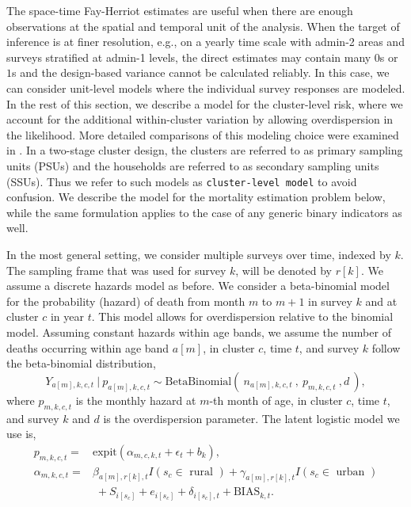 The space-time Fay-Herriot estimates are useful when there are enough observations at the spatial and temporal unit of the analysis. When the target of inference is at finer resolution, e.g., on a yearly time scale with admin-2 areas and surveys stratified at admin-1 levels, the direct estimates may contain many \(0\)s or \(1\)s and the design-based variance cannot be calculated reliably. In this case, we can consider unit-level models where the individual survey responses are modeled. In the rest of this section, we describe a model for the cluster-level risk, where we account for the additional within-cluster variation by allowing overdispersion in the likelihood. More detailed comparisons of this modeling choice were examined in \citep{dong_wakefield_20}. In a two-stage cluster design, the clusters are referred to as primary sampling units (PSUs) and the households are referred to as secondary sampling units (SSUs). Thus we refer to such models as \texttt{cluster-level\ model} to avoid confusion. We describe the model for the mortality estimation problem below, while the same formulation applies to the case of any generic binary indicators as well.

In the most general setting, we consider multiple surveys over time, indexed by \(k\). The sampling frame that was used for survey \(k\), will be denoted by \(r[k]\). We assume a discrete hazards model as before. We consider a beta-binomial model for the probability (hazard) of death from month \(m\) to \(m+1\) in survey \(k\) and at cluster \(c\) in year \(t\). This model allows for overdispersion relative to the binomial model. Assuming constant hazards within age bands, we assume the number of deaths occurring within age band \(a[m]\), in cluster \(c\), time \(t\), and survey \(k\) follow the beta-binomial distribution,
\begin{equation}\label{eq:BB1-age}
Y_{a[m],k,c,t} ~|~  p_{a[m],k,c,t} \sim \mbox{BetaBinomial}\left(~ n_{a[m],k,c,t}~,~ p_{m,k,c,t}~,d~
\right),
\end{equation}
where \(p_{m,k,c,t}\) is the monthly hazard at \(m\)-th month of age, in cluster \(c\), time \(t\), and survey \(k\) and \(d\) is the overdispersion parameter.
The latent logistic model we use is,
\begin{align}
p_{m,k,c,t} =& \mbox{expit}( \alpha_{m,c,k,t} +   \epsilon_t + b_k),\\ \nonumber
\alpha_{m,k,c,t} =&
\beta_{a[m],r[k],t}I(s_c \in \mbox{ rural }) +
\gamma_{a[m],r[k],t} I(s_c \in \mbox{ urban }) \\
&\;+
S_{i[s_c]} + e_{i[s_c]}  +\delta_{i[s_c],t} + \mbox{BIAS}_{k,t}.
\label{eq:pred}
\end{align}

